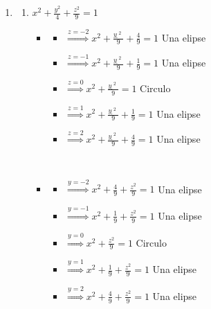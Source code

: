 \documentclass[../practica_02.tex]{subfiles}
\begin{document}
    \begin{enumerate}
        \item
            \begin{enumerate}
                \item $x^2 + \frac{y^2}{4} + \frac{z^2}{9} = 1$

                    \begin{itemize}
                        \item
                            \begin{itemize}
                                \item $\stackrel{z=-2}{\Rightarrow} x^2 + \frac{ỵ^2}{9} + \frac{4}{9} = 1$ Una elipse
                                \item $\stackrel{z=-1}{\Rightarrow} x^2 + \frac{ỵ^2}{9} + \frac{1}{9} = 1$ Una elipse
                                \item $\stackrel{z=0}{\Rightarrow} x^2 + \frac{ỵ^2}{9} = 1$ Circulo
                                \item $\stackrel{z=1}{\Rightarrow} x^2 + \frac{ỵ^2}{9} + \frac{1}{9} = 1$ Una elipse
                                \item $\stackrel{z=2}{\Rightarrow} x^2 + \frac{ỵ^2}{9} + \frac{4}{9} = 1$ Una elipse
                            \end{itemize}

                            $ $

                        \item
                            \begin{itemize}
                                \item $\stackrel{y=-2}{\Rightarrow} x^2 + \frac{4}{9} + \frac{z^2}{9} = 1$ Una elipse
                                \item $\stackrel{y=-1}{\Rightarrow} x^2 + \frac{1}{9} + \frac{z^2}{9} = 1$ Una elipse
                                \item $\stackrel{y=0}{\Rightarrow} x^2 + \frac{z^2}{9} = 1$ Circulo
                                \item $\stackrel{y=1}{\Rightarrow} x^2 + \frac{1}{9} + \frac{z^2}{9} = 1$ Una elipse
                                \item $\stackrel{y=2}{\Rightarrow} x^2 + \frac{4}{9} + \frac{z^2}{9} = 1$ Una elipse
                            \end{itemize}

                            $ $


\end{itemize}
\end{enumerate}
\end{enumerate}
\end{document}
